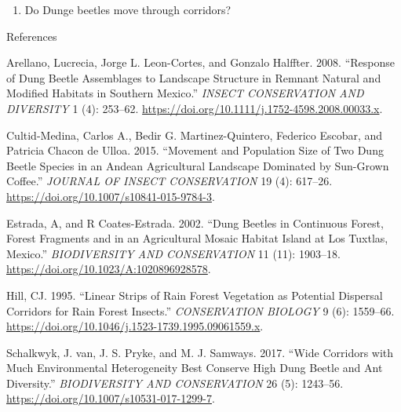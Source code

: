 \documentclass[
  12pt,
]{article}
\providecommand{\tightlist}{%
  \setlength{\itemsep}{0pt}\setlength{\parskip}{0pt}}
\newlength{\cslhangindent}
\newlength{\cslentryspacingunit} %
\newenvironment{CSLReferences}[2] %
 {%
  \setlength{\parindent}{0pt}
  \ifodd #1
  \let\oldpar\par
  \def\par{\hangindent=\cslhangindent\oldpar}
  \fi
  \setlength{\parskip}{#2\cslentryspacingunit}
 }%
 {}
\begin{document}
\begin{enumerate}
\def\labelenumi{\arabic{enumi}.}
\setcounter{enumi}{1}
\tightlist
\item
  Do Dunge beetles move through corridors?
\end{enumerate}

References

\hypertarget{refs}{}
\begin{CSLReferences}{1}{0}
\leavevmode{}%
Arellano, Lucrecia, Jorge L. Leon-Cortes, and Gonzalo Halffter. 2008.
{``Response of Dung Beetle Assemblages to Landscape Structure in Remnant
Natural and Modified Habitats in Southern {Mexico}.''} \emph{INSECT
CONSERVATION AND DIVERSITY} 1 (4): 253--62.
\url{https://doi.org/10.1111/j.1752-4598.2008.00033.x}.

\leavevmode{}%
Cultid-Medina, Carlos A., Bedir G. Martinez-Quintero, Federico Escobar,
and Patricia Chacon de Ulloa. 2015. {``Movement and Population Size of
Two Dung Beetle Species in an {Andean} Agricultural Landscape Dominated
by Sun-Grown Coffee.''} \emph{JOURNAL OF INSECT CONSERVATION} 19 (4):
617--26. \url{https://doi.org/10.1007/s10841-015-9784-3}.

\leavevmode{}%
Estrada, A, and R Coates-Estrada. 2002. {``Dung Beetles in Continuous
Forest, Forest Fragments and in an Agricultural Mosaic Habitat Island at
{Los} {Tuxtlas}, {Mexico}.''} \emph{BIODIVERSITY AND CONSERVATION} 11
(11): 1903--18. \url{https://doi.org/10.1023/A:1020896928578}.

\leavevmode{}%
Hill, CJ. 1995. {``Linear Strips of Rain Forest Vegetation as Potential
Dispersal Corridors for Rain Forest Insects.''} \emph{CONSERVATION
BIOLOGY} 9 (6): 1559--66.
\url{https://doi.org/10.1046/j.1523-1739.1995.09061559.x}.

\leavevmode{}%
Schalkwyk, J. van, J. S. Pryke, and M. J. Samways. 2017. {``Wide
Corridors with Much Environmental Heterogeneity Best Conserve High Dung
Beetle and Ant Diversity.''} \emph{BIODIVERSITY AND CONSERVATION} 26
(5): 1243--56. \url{https://doi.org/10.1007/s10531-017-1299-7}.

\end{CSLReferences}
\end{document}
